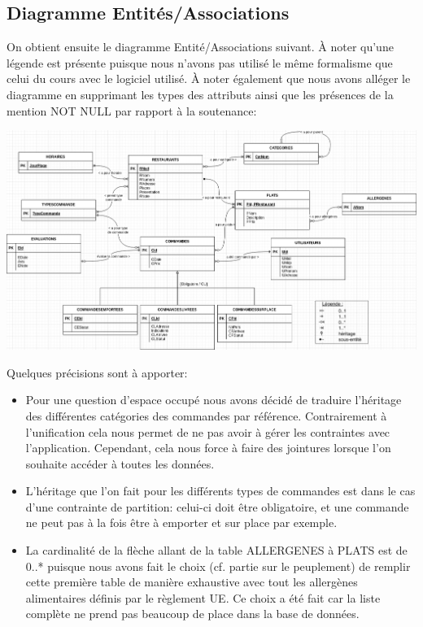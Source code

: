 \documentclass[10pt, a4paper]{article}
\begin{document}
\begin{landscape}
    \newpage
    \subsection{Diagramme Entités/Associations}
    On obtient ensuite le diagramme Entité/Associations suivant. À noter qu'une légende est présente puisque nous n'avons pas utilisé le même formalisme que celui du cours avec le logiciel utilisé. À noter également que nous avons alléger le diagramme en supprimant les types des attributs ainsi que les présences de la mention NOT NULL par rapport à la soutenance:
    \begin{center}
        \includegraphics[scale=0.45]{Diagramme_entite_relation.png}\\
    \end{center}

\end{landscape}

Quelques précisions sont à apporter:

\begin{itemize}
    \item Pour une question d'espace occupé nous avons décidé de traduire l'héritage des différentes catégories des commandes par référence. Contrairement à l'unification cela nous permet de ne pas avoir à gérer les contraintes avec l'application. Cependant, cela nous force à faire des jointures lorsque l'on souhaite accéder à toutes les données.
    \item L'héritage que l'on fait pour les différents types de commandes est dans le cas d'une contrainte de partition: celui-ci doit être obligatoire, et une commande ne peut pas à la fois être à emporter et sur place par exemple.
    \item La cardinalité de la flèche allant de la table ALLERGENES à PLATS est de 0..* puisque nous avons fait le choix (cf. partie sur le peuplement) de remplir cette première table de manière exhaustive avec tout les allergènes alimentaires définis par le règlement UE. Ce choix a été fait car la liste complète ne prend pas beaucoup de place dans la base de données.

\end{itemize}
\end{document}
